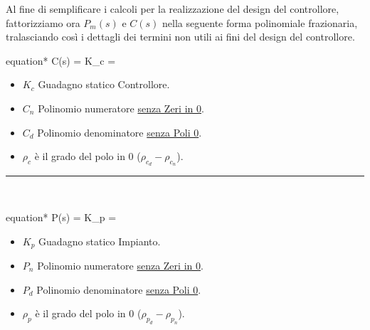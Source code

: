 \begin{oss} \label{oss:Fattorizzazione}
	Al fine di semplificare i calcoli per la realizzazione del design del controllore, fattorizziamo ora $ P_m(s) $ e $ C(s) $ nella seguente forma polinomiale frazionaria, tralasciando così i dettagli dei termini non utili ai fini del design del controllore.\\[0mm]
	\begin{vwcol}[widths={9cm,4cm}, sep=0mm, rule=0px]
		\vspace{-8mm}
		\begin{empheq}[box=\mathCalc]{equation*}
			C(s) = K_c \cdot {} =
			 \cdot {}
		\end{empheq}
		\newpage
		\begin{spacing}{1.25}
			{\scriptsize
				\begin{itemize}[itemsep=-1mm,leftmargin=6mm]
					\item $ K_c $ Guadagno statico Controllore.
					\item $ C_n $ Polinomio numeratore \underline{senza Zeri in 0}.
					\item $ C_d $ Polinomio denominatore \underline{senza Poli 0}.
					\item $ \rho_c $ è il grado del polo in 0 ($ \rho_{c_d} - \rho_{c_n} $).
				\end{itemize}
			}
		\end{spacing}
	\end{vwcol}

	\noindent\rule[0.5ex]{\linewidth}{0.5pt}\\[0mm]

	\begin{vwcol}[widths={9cm,4cm}, sep=0mm, rule=0px]
		\vspace{-10mm}
		\begin{empheq}[box=\mathCalc]{equation*}
			P(s) = K_p \cdot {} =
			 \cdot {}
		\end{empheq}
		\newpage
		\begin{spacing}{1.25}
			{\scriptsize
				\begin{itemize}[itemsep=-1mm,leftmargin=6mm]
					\item $ K_p $ Guadagno statico Impianto.
					\item $ P_n $ Polinomio numeratore \underline{senza Zeri in 0}.
					\item $ P_d $ Polinomio denominatore \underline{senza Poli 0}.
					\item $ \rho_p $ è il grado del polo in 0 ($ \rho_{p_d} - \rho_{p_n} $).
				\end{itemize}
			}
		\end{spacing}
	\end{vwcol}
\end{oss}
